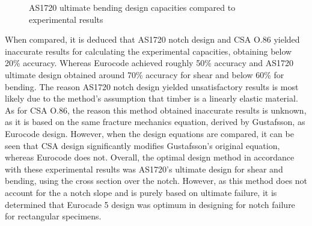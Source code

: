 \documentclass[11pt,a4paper]{article}
\numberwithin{equation}{subsection}
\begin{document}
\vspace*{\baselineskip}

\begin{figure}[h]
	\begin{center}
	\end{center}
	\caption{AS1720 ultimate bending design capacities compared to experimental results}
	\label{fig:Des_Comp}
\end{figure}

\noindent
When compared, it is deduced that AS1720 notch design and CSA O.86 yielded inaccurate results for calculating the experimental capacities, obtaining below 20\% accuracy. Whereas Eurocode achieved roughly 50\% accuracy and AS1720 ultimate design obtained around 70\% accuracy for shear and below 60\% for bending. The reason AS1720 notch design yielded unsatisfactory results is most likely due to the method's assumption that timber is a linearly elastic material. As for CSA O.86, the reason this method obtained inaccurate results is unknown, as it is based on the same fracture mechanics equation, derived by Gustafsson, as Eurocode design. However, when the design equations are compared, it can  be seen that CSA design significantly modifies Gustafsson's original equation, whereas Eurocode does not. Overall, the optimal design method in accordance with these experimental results was AS1720's ultimate design for shear and bending, using the cross section over the notch. However, as this method does not account for the a notch slope and is purely based on ultimate failure, it is determined that Eurocade 5 design was optimum in designing for notch failure for rectangular specimens.
\end{document}
